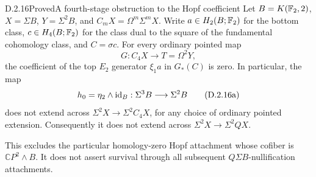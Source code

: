 \begin{claim}{D.2.16}{Proved}{A fourth-stage obstruction to the Hopf coefficient}
Let $B=K(\mathbb F_2,2)$, $X=\Sigma B$, $Y=\Sigma^2B$, and
$C_mX=\Omega^m\Sigma^mX$. Write $a\in H_2(B;\mathbb F_2)$ for
the bottom class, $c\in H_4(B;\mathbb F_2)$ for the class dual to
the square of the fundamental cohomology class, and $C=\sigma c$.
For every ordinary pointed map
\[
 G:C_4X\longrightarrow T=\Omega^2Y,
\]
the coefficient of the top $E_2$ generator $\xi_1a$ in
$G_*(C)$ is zero. In particular, the map
\[
 h_0=\eta_2\wedge\mathrm{id}_B:\Sigma^3B\longrightarrow\Sigma^2B
 \tag{D.2.16a}
\]
does not extend across
$\Sigma^2X\to\Sigma^2C_4X$, for any choice of ordinary pointed
extension. Consequently it does not extend across
$\Sigma^2X\to\Sigma^2QX$.

This excludes the particular homology-zero Hopf attachment whose
cofiber is $\mathbb CP^2\wedge B$. It does not assert survival
through all subsequent $Q\Sigma B$-nullification attachments.
\end{claim}
